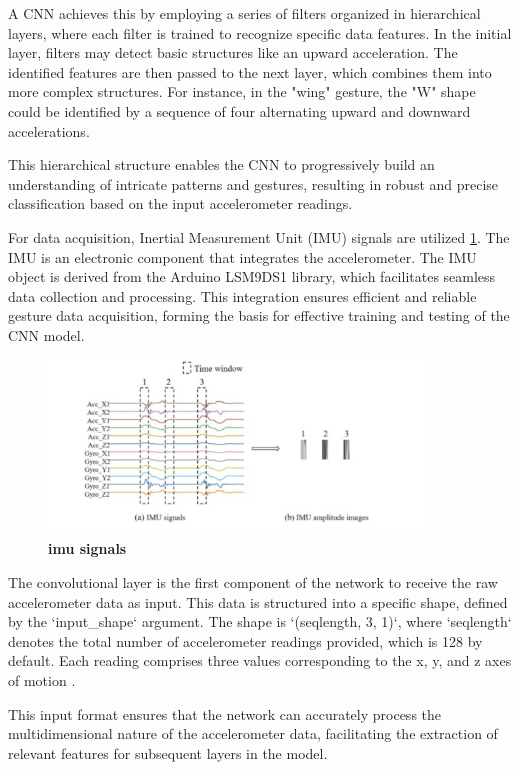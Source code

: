 A CNN achieves this by employing a series of filters organized in hierarchical layers, where each filter is trained to recognize specific data features. In the initial layer, filters may detect basic structures like an upward acceleration. The identified features are then passed to the next layer, which combines them into more complex structures. For instance, in the "wing" gesture, the "W" shape could be identified by a sequence of four alternating upward and downward accelerations.  

This hierarchical structure enables the CNN to progressively build an understanding of intricate patterns and gestures, resulting in robust and precise classification based on the input accelerometer readings.  

For data acquisition, Inertial Measurement Unit (IMU) signals are utilized \ref{fig:IMU}. The IMU is an electronic component that integrates the accelerometer. The IMU object is derived from the Arduino LSM9DS1 library, which facilitates seamless data collection and processing. This integration ensures efficient and reliable gesture data acquisition, forming the basis for effective training and testing of the CNN model.  

\begin{figure}[h!]
	\begin{center}
		\includegraphics[width=100mm]{Images/KDD/IMU}
		\caption{\textbf{\ac{imu} signals \cite{Xu:2022} }}
		\label{fig:IMU}
	\end{center}
\end{figure}

The convolutional layer is the first component of the network to receive the raw accelerometer data as input. This data is structured into a specific shape, defined by the `input\_shape` argument. The shape is `(seqlength, 3, 1)`, where `seqlength` denotes the total number of accelerometer readings provided, which is 128 by default. Each reading comprises three values corresponding to the x, y, and z axes of motion \cite{Xu:2022}. 

This input format ensures that the network can accurately process the multidimensional nature of the accelerometer data, facilitating the extraction of relevant features for subsequent layers in the model.

